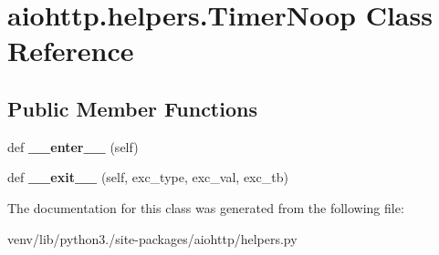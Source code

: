 \hypertarget{classaiohttp_1_1helpers_1_1_timer_noop}{}\section{aiohttp.\+helpers.\+Timer\+Noop Class Reference}
\label{classaiohttp_1_1helpers_1_1_timer_noop}
\subsection*{Public Member Functions}
\begin{DoxyCompactItemize}
\item 
\mbox{\label{classaiohttp_1_1helpers_1_1_timer_noop_afc02e245351229f805ecd7393f76806b}} 
def {\bfseries \+\_\+\+\_\+enter\+\_\+\+\_\+} (self)
\item 
\mbox{\label{classaiohttp_1_1helpers_1_1_timer_noop_ad3b28e5821f2d9b42d5025bce5415339}} 
def {\bfseries \+\_\+\+\_\+exit\+\_\+\+\_\+} (self, exc\+\_\+type, exc\+\_\+val, exc\+\_\+tb)
\end{DoxyCompactItemize}


The documentation for this class was generated from the following file\+:\begin{DoxyCompactItemize}
\item 
venv/lib/python3./site-\/packages/aiohttp/helpers.\+py\end{DoxyCompactItemize}
